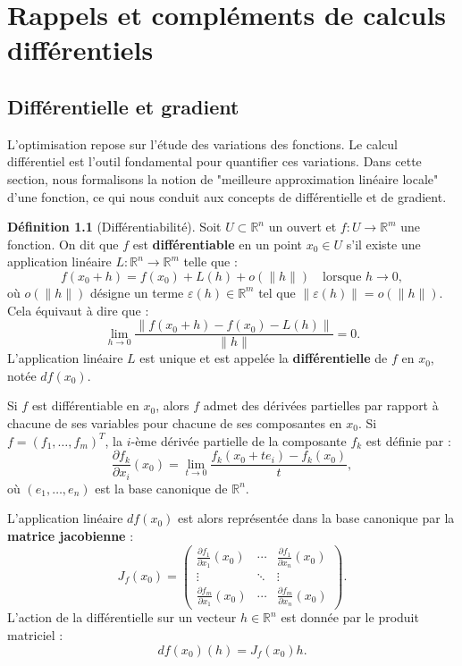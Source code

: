 \documentclass[a4paper,12pt,openany]{book}
\theoremstyle{plain}
\theoremstyle{definition}
\newtheorem{definition}[theorem]{Définition}
\theoremstyle{remark}
\theoremstyle{nbstyle}
\begin{document}
	
	\tableofcontents
	
	\mainmatter
	
	\chapter{Rappels et compléments de calculs différentiels}
	\label{chap:calcul_diff}
	
	\section{Différentielle et gradient}
	
	L'optimisation repose sur l'étude des variations des fonctions. Le calcul différentiel est l'outil fondamental pour quantifier ces variations. Dans cette section, nous formalisons la notion de "meilleure approximation linéaire locale" d'une fonction, ce qui nous conduit aux concepts de différentielle et de gradient.
	
	\begin{definition}[Différentiabilité]
		Soit \(U \subset \mathbb{R}^n\) un ouvert et \(f : U \to \mathbb{R}^m\) une fonction. On dit que \(f\) est \textbf{différentiable} en un point \(x_0 \in U\) s'il existe une application linéaire \(L : \mathbb{R}^n \to \mathbb{R}^m\) telle que :
		\[
		f(x_0 + h) = f(x_0) + L(h) + o(\lVert h \rVert) \quad \text{lorsque } h \to 0,
		\]
		où \(o(\lVert h \rVert)\) désigne un terme \(\varepsilon(h) \in \mathbb{R}^m\) tel que \(\lVert \varepsilon(h) \rVert = o(\lVert h \rVert)\). Cela équivaut à dire que :
		\[
		\lim_{h \to 0} \frac{\lVert f(x_0 + h) - f(x_0) - L(h) \rVert}{\lVert h \rVert} = 0.
		\]
		L'application linéaire \(L\) est unique et est appelée la \textbf{différentielle} de \(f\) en \(x_0\), notée \(df(x_0)\).
	\end{definition}
	Si \(f\) est différentiable en \(x_0\), alors \(f\) admet des dérivées partielles par rapport à chacune de ses variables pour chacune de ses composantes en \(x_0\). Si \(f = (f_1, \dots, f_m)^T\), la \(i\)-ème dérivée partielle de la composante \(f_k\) est définie par :
	\[
	\frac{\partial f_k}{\partial x_i}(x_0) = \lim_{t \to 0} \frac{f_k(x_0 + t e_i) - f_k(x_0)}{t},
	\]
	où \((e_1, \dots, e_n)\) est la base canonique de \(\mathbb{R}^n\).
	
	L'application linéaire \(df(x_0)\) est alors représentée dans la base canonique par la \textbf{matrice jacobienne} :
	\[
	J_f(x_0) = \begin{pmatrix}
	\frac{\partial f_1}{\partial x_1}(x_0) & \cdots & \frac{\partial f_1}{\partial x_n}(x_0) \\
	\vdots & \ddots & \vdots \\
	\frac{\partial f_m}{\partial x_1}(x_0) & \cdots & \frac{\partial f_m}{\partial x_n}(x_0)
	\end{pmatrix}.
	\]
	L'action de la différentielle sur un vecteur \(h \in \mathbb{R}^n\) est donnée par le produit matriciel :
	\[
	df(x_0)(h) = J_f(x_0) h.
	\]
	
\end{document}
